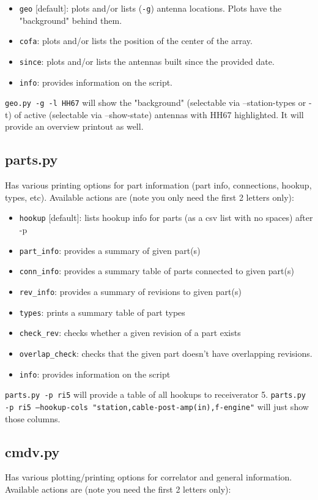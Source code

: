 \documentclass{article}[10pt]
\begin{document}
\begin{itemize}
\item {\tt geo} [default]:  plots and/or lists ({\tt -g}) antenna locations.  Plots have the "background" behind them.
\item {\tt cofa}:  plots and/or lists the position of the center of the array.
\item {\tt since}:  plots and/or lists the antennas built since the provided date.
\item {\tt info}:  provides information on the script.
\end{itemize}

{\tt geo.py -g -l HH67} will show the "background" (selectable via --station-types or -t) of active (selectable via --show-state) antennas with HH67 highlighted.  It will provide an overview printout as well.

\subsection{parts.py}
Has various printing options for part information (part info, connections, hookup, types, etc).  Available actions are (note you only need the first 2 letters only):

\begin{itemize}
\item {\tt hookup} [default]:  lists hookup info for parts (as a csv list with no spaces) after -p
\item {\tt part\_info}:   provides a summary of given part(s)
\item {\tt conn\_info}:   provides a summary table of parts connected to given part(s)
\item {\tt rev\_info}:  provides a summary of revisions to given part(s)
\item {\tt types}:  prints a summary table of part types
\item {\tt check\_rev}:  checks whether a given revision of a part exists
\item {\tt overlap\_check}:  checks that the given part doesn't have overlapping revisions.
\item {\tt info}:   provides information on the script
\end{itemize}

{\tt parts.py -p ri5} will provide a table of all hookups to receiverator 5.  {\tt parts.py -p ri5 --hookup-cols "station,cable-post-amp(in),f-engine"}  will just show those columns.

\subsection{cmdv.py}
Has various plotting/printing options for correlator and general information.  Available actions are (note you need the first 2 letters only):
\end{document}
